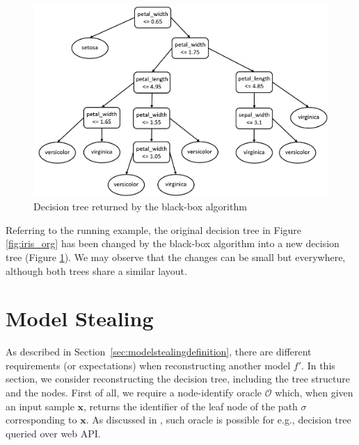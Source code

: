 

\begin{figure}[!thbp]
    \centering
    \includegraphics[width=0.8\linewidth]{images/simpleML/2.png}
    \caption{Decision tree returned by the black-box algorithm}
    \label{fig:iris_blackbox}
\end{figure}

Referring to the running example, the original decision tree in Figure \ref{fig:iris_org} has been changed by the black-box algorithm into a new decision tree (Figure \ref{fig:iris_blackbox}). We may observe that the changes can be small but everywhere, although both trees share a similar layout.

\section{Model Stealing}

As described in Section~\ref{sec:modelstealingdefinition}, there are different requirements (or expectations) when  reconstructing another model $f'$. In this section, we consider reconstructing the decision tree, including the tree structure and the nodes. 
First of all, we require a node-identify oracle $\mathcal{O}$ which, when given an input sample $\textbf{x}$, returns the identifier of the leaf node of the path $\sigma$ corresponding to $\textbf{x}$. As discussed in \cite{10.5555/3241094.3241142}, such oracle is possible for e.g., decision tree queried over web API. 


